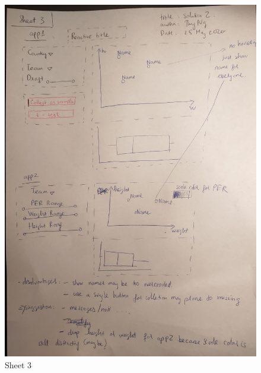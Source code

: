 \documentclass[a4paper,12pt,twoside]{article}
\numberwithin{equation}{section}
\begin{document}
\begin{figure}[h]
\caption{Sheet 3}
\includegraphics[scale=0.15]{o3.jpg}
\centering
\end{figure}
\end{document}
